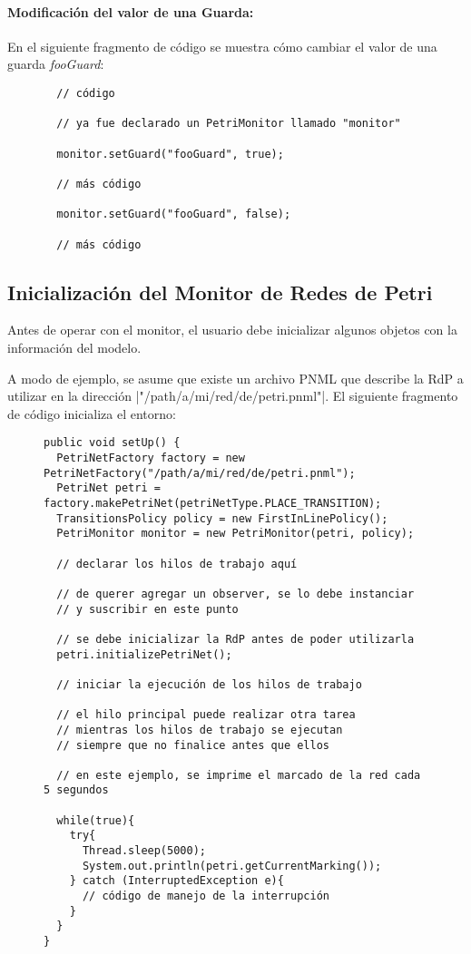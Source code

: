 \paragraph{Modificación del valor de una Guarda:} En el siguiente fragmento de
código se muestra cómo cambiar el valor de una guarda \textit{fooGuard}:

\begin{figure}[H]
\centering
\begin{verbatim}
  // código
  
  // ya fue declarado un PetriMonitor llamado "monitor"
  
  monitor.setGuard("fooGuard", true);
  
  // más código
  
  monitor.setGuard("fooGuard", false);
  
  // más código
\end{verbatim}
\end{figure}

\subsection{Inicialización del Monitor de Redes de Petri}

Antes de operar con el monitor, el usuario debe inicializar algunos
objetos con la información del modelo.

A modo de ejemplo, se asume que existe un archivo PNML que describe la RdP a
utilizar en la dirección |"/path/a/mi/red/de/petri.pnml"|. El
siguiente fragmento de código inicializa  el entorno:

\begin{figure}[H]
\centering
\begin{verbatim}
public void setUp() {
  PetriNetFactory factory = new PetriNetFactory("/path/a/mi/red/de/petri.pnml");
  PetriNet petri = factory.makePetriNet(petriNetType.PLACE_TRANSITION);
  TransitionsPolicy policy = new FirstInLinePolicy();
  PetriMonitor monitor = new PetriMonitor(petri, policy);
  
  // declarar los hilos de trabajo aquí
  
  // de querer agregar un observer, se lo debe instanciar
  // y suscribir en este punto
  
  // se debe inicializar la RdP antes de poder utilizarla
  petri.initializePetriNet();
  
  // iniciar la ejecución de los hilos de trabajo
  
  // el hilo principal puede realizar otra tarea
  // mientras los hilos de trabajo se ejecutan
  // siempre que no finalice antes que ellos
  
  // en este ejemplo, se imprime el marcado de la red cada 5 segundos
  
  while(true){
    try{
      Thread.sleep(5000);
      System.out.println(petri.getCurrentMarking());
    } catch (InterruptedException e){
      // código de manejo de la interrupción
    }
  }
}
\end{verbatim}
\end{figure}

